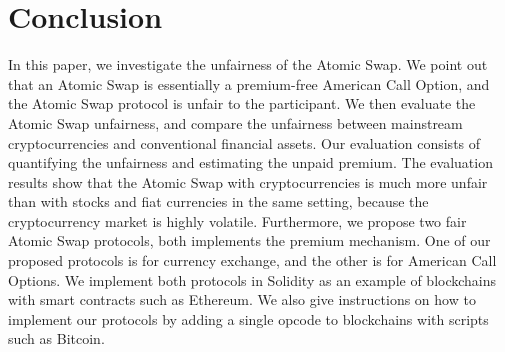 \section{Conclusion}
\label{sec:conclusion}


In this paper, we investigate the unfairness of the Atomic Swap.
We point out that an Atomic Swap is essentially a premium-free American Call Option,
and the Atomic Swap protocol is unfair to the participant.
We then evaluate the Atomic Swap unfairness, and compare the unfairness between mainstream cryptocurrencies and conventional financial assets.
Our evaluation consists of quantifying the unfairness and estimating the unpaid premium.
The evaluation results show that the Atomic Swap with cryptocurrencies is much more unfair than with stocks and fiat currencies in the same setting, because the cryptocurrency market is highly volatile.
Furthermore, we propose two fair Atomic Swap protocols, both implements the premium mechanism.
One of our proposed protocols is for currency exchange, and the other is for American Call Options.
We implement both protocols in Solidity as an example of blockchains with smart contracts such as Ethereum.
We also give instructions on how to implement our protocols by adding a single opcode to blockchains with scripts such as Bitcoin.